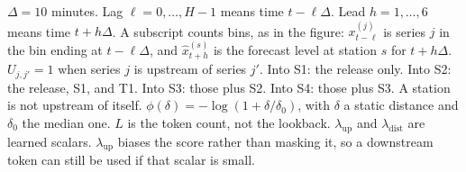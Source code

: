 \documentclass[11pt,a4paper]{article}
\begin{document}
\(\Delta = 10\) minutes. Lag \(\ell = 0,\ldots,H-1\) means time \(t-\ell\Delta\). Lead \(h=1,\ldots,6\) means time \(t+h\Delta\). A subscript counts bins, as in the figure: \(x^{(j)}_{t-\ell}\) is series \(j\) in the bin ending at \(t-\ell\Delta\), and \(\hat x^{(s)}_{t+h}\) is the forecast level at station \(s\) for \(t+h\Delta\). \(U_{j,j'}=1\) when series \(j\) is upstream of series \(j'\). Into S1: the release only. Into S2: the release, S1, and T1. Into S3: those plus S2. Into S4: those plus S3. A station is not upstream of itself. \(\phi(\delta)=-\log(1+\delta/\delta_0)\), with \(\delta\) a static distance and \(\delta_0\) the median one. \(L\) is the token count, not the lookback. \(\lambda_{\mathrm{up}}\) and \(\lambda_{\mathrm{dist}}\) are learned scalars. \(\lambda_{\mathrm{up}}\) biases the score rather than masking it, so a downstream token can still be used if that scalar is small.
\end{document}
